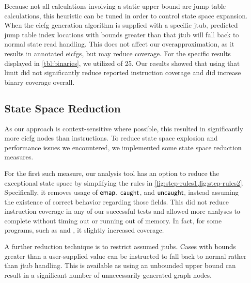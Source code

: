 Because not all calculations involving a static upper bound are jump table calculations, this heuristic can be tuned in order to control state space expansion.
When the \gls{eicfg} generation algorithm is supplied with a specific \gls{jtub}, predicted jump table index locations with bounds greater than that \gls{jtub} will fall back to normal state read handling.
This does not affect our overapproximation, as it results in annotated \glspl{eicfg}, but may reduce coverage.
For the specific results displayed in \cref{tbl:binaries}, we utilized  of 25.
Our results showed that using that limit did not significantly reduce reported instruction coverage and did increase binary coverage overall.

\subsection{State Space Reduction}
As our approach is context-sensitive where possible, this resulted in significantly more \gls{eicfg} nodes than instructions.
To reduce state space explosion and performance issues we encountered, we implemented some state space reduction measures.

For the first such measure, our analysis tool has an option to reduce the exceptional state space by simplifying the rules in \cref{fig:step-rules1,fig:step-rules2}.
Specifically, it removes usage of $\operatorname{\mathsf{emap}}$, $\mathsf{caught}$, and $\mathsf{uncaught}$, instead assuming the existence of correct behavior regarding those fields.
This did not reduce instruction coverage in any of our successful tests and allowed more analyses to complete without timing out or running out of memory.
In fact, for some programs, such as  and , it slightly increased coverage.

A further reduction technique is to restrict assumed \glspl{jtub}.
Cases with bounds greater than a user-supplied value can be instructed to fall back to normal rather than \gls{jtub} handling.
This is available as using an unbounded upper bound can result in a significant number of unnecessarily-generated graph nodes.

